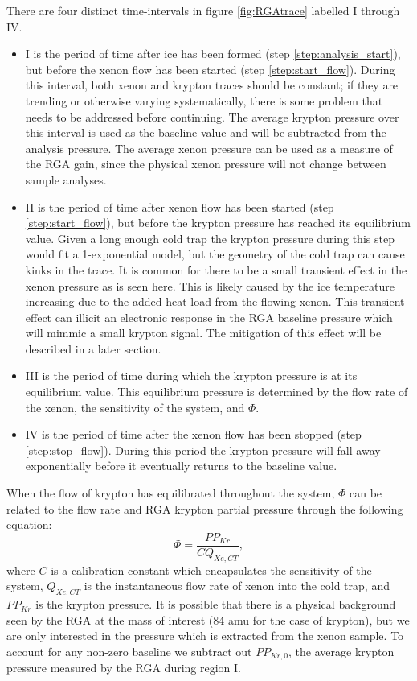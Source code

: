 There are four distinct time-intervals in figure \ref{fig:RGAtrace} labelled I through IV. 
\begin{itemize}
\item I is the period of time after ice has been formed (step \ref{step:analysis_start}), but before the xenon flow has been started (step \ref{step:start_flow}). During this interval, both xenon and krypton traces should be constant; if they are trending or otherwise varying systematically, there is some problem that needs to be addressed before continuing. The average krypton pressure over this interval is used as the baseline value and will be subtracted from the analysis pressure. The average xenon pressure can be used as a measure of the RGA gain, since the physical xenon pressure will not change between sample analyses. 
\item II is the period of time after xenon flow has been started (step \ref{step:start_flow}), but before the krypton pressure has reached its equilibrium value. Given a long enough cold trap the krypton pressure during this step would fit a 1-exponential model, but the geometry of the cold trap can cause kinks in the trace. It is common for there to be a small transient effect in the xenon pressure as is seen here. This is likely caused by the ice temperature increasing due to the added heat load from the flowing xenon. This transient effect can illicit an electronic response in the RGA baseline pressure which will mimmic a small krypton signal. The mitigation of this effect will be described in a later section.
\item III is the period of time during which the krypton pressure is at its equilibrium value. This equilibrium pressure is determined by the flow rate of the xenon, the sensitivity of the system, and $\Phi$.
\item IV is the period of time after the xenon flow has been stopped (step \ref{step:stop_flow}). During this period the krypton pressure will fall away exponentially before it eventually returns to the baseline value.
\end{itemize}

When the flow of krypton has equilibrated throughout the system, $\Phi$ can be related to the flow rate and RGA krypton partial pressure through the following equation: 
\begin{equation}
\label{eq:basic_analysis}
\Phi=\frac{PP_{Kr}}{CQ_{Xe,CT}},
\end{equation}
where $C$ is a calibration constant which encapsulates the sensitivity of the system, $Q_{Xe,CT}$ is the instantaneous flow rate of xenon into the cold trap, and $PP_{Kr}$ is the krypton pressure. It is possible that there is a physical background seen by the RGA at the mass of interest (84 amu for the case of krypton), but we are only interested in the pressure which is extracted from the xenon sample. To account for any non-zero baseline we subtract out $\overline{PP}_{Kr,0}$, the average krypton pressure measured by the RGA during region I. 

